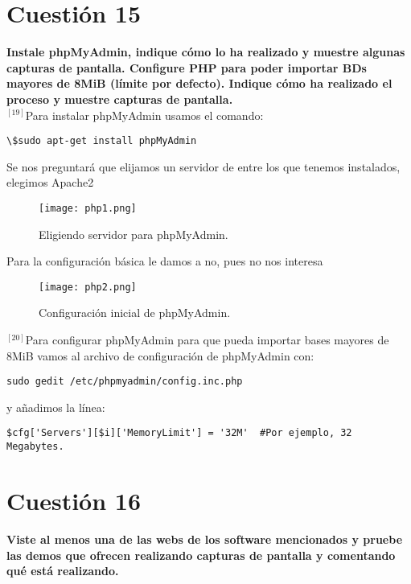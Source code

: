 \documentclass[a4paper, 11pt]{article} %
\begin{document}
\pagebreak

\section{Cuestión 15}
\textbf{Instale phpMyAdmin, indique cómo lo ha realizado y muestre algunas capturas de pantalla. Configure PHP para poder importar BDs
mayores de 8MiB (límite por defecto). Indique cómo ha realizado el proceso y muestre capturas de pantalla.}\\

$^{[19]}$Para instalar phpMyAdmin usamos el comando:
\begin{verbatim}
\$sudo apt-get install phpMyAdmin
\end{verbatim}
Se nos preguntará que elijamos un servidor de entre los que tenemos instalados, elegimos Apache2
\begin{figure}[h]
\centering 
\texttt{[image: php1.png]} 
\caption{Eligiendo servidor para phpMyAdmin.} 
\vspace{-0.5cm}
\label{contexto:figura} 
\end{figure}

\pagebreak

Para la configuración básica le damos a no, pues no nos interesa
\begin{figure}[h]
\centering 
\texttt{[image: php2.png]} 
\caption{Configuración inicial de phpMyAdmin.} 
\vspace{-0.5cm}
\label{contexto:figura} 
\end{figure}

$^{[20]}$Para configurar phpMyAdmin para que pueda importar bases mayores de 8MiB vamos al archivo de configuración de phpMyAdmin con:
\begin{verbatim}
sudo gedit /etc/phpmyadmin/config.inc.php
\end{verbatim}

y añadimos la línea: 
\begin{verbatim}
$cfg['Servers'][$i]['MemoryLimit'] = '32M'  #Por ejemplo, 32 Megabytes.
\end{verbatim}


\pagebreak

\section{Cuestión 16}
\textbf{Viste al menos una de las webs de los software mencionados y pruebe las demos que ofrecen realizando capturas de pantalla y comentando qué está realizando.}\\
\end{document}
